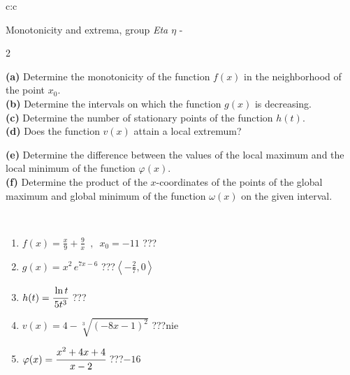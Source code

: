 \documentclass[10pt]{report}
\begin{document}
\begin{tabular}{c:c}
\begin{minipage}[c][104.5mm][t]{0.5\linewidth}
\begin{center}
\vspace{5mm}
{\huge Monotonicity and extrema, group \textit{Eta $\eta$} -}\\[5mm]
\begin{minipage}{0.95\linewidth}
\begin{center}
{\small \begin{multicols}{2} \raggedright
\textbf{(a)} Determine the monotonicity of the function \(f(x)\) in the neighborhood of the point \(x_0\). \\[1mm]
\textbf{(b)} Determine the intervals on which the function \(g(x)\) is decreasing. \\[1mm]
\textbf{(c)} Determine the number of stationary points of the function \(h(t)\). \\[1mm]
\textbf{(d)} Does the function \(v(x)\) attain a local extremum? \par \columnbreak
\textbf{(e)} Determine the difference between the values of the local maximum and the local minimum of the function \(\varphi(x)\). \\[1mm]
\textbf{(f)} Determine the product of the \(x\)-coordinates of the points of the global maximum and global minimum of the function \(\omega(x)\) on the given interval. \\[1mm]
\end{multicols}
}
\end{center}
\end{minipage}
\\[1mm]
\begin{minipage}{0.79\linewidth}
\begin{center}
\begin{varwidth}{\linewidth}
\setlength{\itemsep}{0pt}
\begin{enumerate}
\normalsize
\item $f(x)=\frac{x}{9}+\frac{9}{x} \enspace , \enspace x_0=-11$\quad \dotfill\; ???\;\dotfill \quad {}
\item $g(x)=x^2\, e^{7x-6}$\quad \dotfill\; ???\;\dotfill \quad $\left\langle-\frac{2}{7} , 0\right\rangle$
\item $h(t)=\cfrac{\ln t}{5t^3}$\quad \dotfill\; ???\;\dotfill {}
\item $v(x)=4-\sqrt[3]{(-8x-1)^2}$\quad \dotfill\; ???\;\dotfill \quad $\text{nie}$
\item $\varphi(x)=\cfrac{x^2+4x+4}{x-2}$\quad \dotfill\; ???\;\dotfill \quad $-16$

\end{enumerate}
\end{varwidth}
\end{center}
\end{minipage}
\end{center}
\end{minipage}
\end{tabular}
\end{document}
